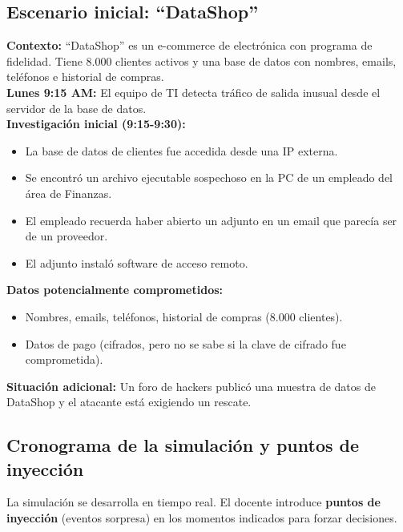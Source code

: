 \documentclass[12pt,a4paper]{article}
\begin{document}
\subsection{Escenario inicial: ``DataShop''}

\begin{tcolorbox}[colback=grisClaro, colframe=rojoCrisis, arc=3mm]
\textbf{Contexto:} ``DataShop'' es un e-commerce de electr\'onica con programa de fidelidad. Tiene 8.000 clientes activos y una base de datos con nombres, emails, tel\'efonos e historial de compras.\\[4pt]
\textbf{Lunes 9:15 AM:} El equipo de TI detecta tr\'afico de salida inusual desde el servidor de la base de datos.\\[4pt]
\textbf{Investigaci\'on inicial (9:15-9:30):}
\begin{itemize}[leftmargin=1.5em]
    \item La base de datos de clientes fue accedida desde una IP externa.
    \item Se encontr\'o un archivo ejecutable sospechoso en la PC de un empleado del \'area de Finanzas.
    \item El empleado recuerda haber abierto un adjunto en un email que parec\'ia ser de un proveedor.
    \item El adjunto instal\'o software de acceso remoto.
\end{itemize}
\textbf{Datos potencialmente comprometidos:}
\begin{itemize}[leftmargin=1.5em]
    \item Nombres, emails, tel\'efonos, historial de compras (8.000 clientes).
    \item Datos de pago (cifrados, pero no se sabe si la clave de cifrado fue comprometida).
\end{itemize}
\textbf{Situaci\'on adicional:} Un foro de hackers public\'o una muestra de datos de DataShop y el atacante est\'a exigiendo un rescate.
\end{tcolorbox}

\newpage
\subsection{Cronograma de la simulaci\'on y puntos de inyecci\'on}

La simulaci\'on se desarrolla en tiempo real. El docente introduce \textbf{puntos de inyecci\'on} (eventos sorpresa) en los momentos indicados para forzar decisiones.
\end{document}

